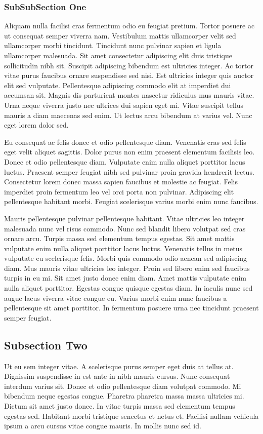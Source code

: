 \documentclass{article}
\begin{document}
\subsubsection{SubSubSection One}Aliquam nulla facilisi cras fermentum odio eu feugiat pretium. Tortor posuere ac ut consequat semper viverra nam. Vestibulum mattis ullamcorper velit sed ullamcorper morbi tincidunt. Tincidunt nunc pulvinar sapien et ligula ullamcorper malesuada.\cite{WhitePaper} Sit amet consectetur adipiscing elit duis tristique sollicitudin nibh sit. Suscipit adipiscing bibendum est ultricies integer. Ac tortor vitae purus faucibus ornare suspendisse sed nisi. Est ultricies integer quis auctor elit sed vulputate. Pellentesque adipiscing commodo elit at imperdiet dui accumsan sit. Magnis dis parturient montes nascetur ridiculus mus mauris vitae. Urna neque viverra justo nec ultrices dui sapien eget mi. Vitae suscipit tellus mauris a diam maecenas sed enim. Ut lectus arcu bibendum at varius vel. Nunc eget lorem dolor sed.\cite{note1}

Eu consequat ac felis donec et odio pellentesque diam. Venenatis cras sed felis eget velit aliquet sagittis. Dolor purus non enim praesent elementum facilisis leo. Donec et odio pellentesque diam. Vulputate enim nulla aliquet porttitor lacus luctus.\cite{Booker} Praesent semper feugiat nibh sed pulvinar proin gravida hendrerit lectus. Consectetur lorem donec massa sapien faucibus et molestie ac feugiat. Felis imperdiet proin fermentum leo vel orci porta non pulvinar. Adipiscing elit pellentesque habitant morbi. Feugiat scelerisque varius morbi enim nunc faucibus.

Mauris pellentesque pulvinar pellentesque habitant. Vitae ultricies leo integer malesuada nunc vel risus commodo. Nunc sed blandit libero volutpat sed cras ornare arcu. Turpis massa sed elementum tempus egestas. Sit amet mattis vulputate enim nulla aliquet porttitor lacus luctus. Venenatis tellus in metus vulputate eu scelerisque felis. Morbi quis commodo odio aenean sed adipiscing diam. Mus mauris vitae ultricies leo integer. Proin sed libero enim sed faucibus turpis in eu mi. Sit amet justo donec enim diam. Amet mattis vulputate enim nulla aliquet porttitor. Egestas congue quisque egestas diam. In iaculis nunc sed augue lacus viverra vitae congue eu. Varius morbi enim nunc faucibus a pellentesque sit amet porttitor. In fermentum posuere urna nec tincidunt praesent semper feugiat.

\subsection {Subsection Two}
Ut eu sem integer vitae. A scelerisque purus semper eget duis at tellus at. Dignissim suspendisse in est ante in nibh mauris cursus. Nunc consequat interdum varius sit. Donec et odio pellentesque diam volutpat commodo. Mi bibendum neque egestas congue. Pharetra pharetra massa massa ultricies mi. Dictum sit amet justo donec. In vitae turpis massa sed elementum tempus egestas sed. Habitant morbi tristique senectus et netus et. Facilisi nullam vehicula ipsum a arcu cursus vitae congue mauris. In mollis nunc sed id.
\end{document}
